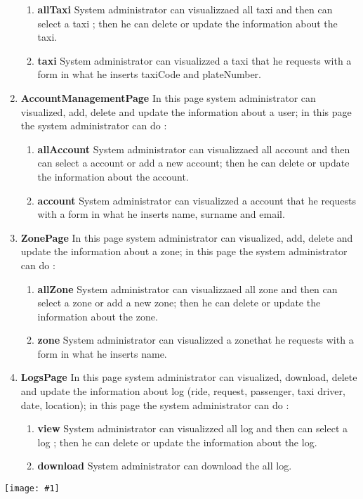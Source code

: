 \documentclass[11pt, a4paper,titlepage]{article}
\newcommand{\image}[1]{
	\begin{center}
		\noindent \texttt{[image: \#1]}
	\end{center}
	}
\begin{document}
\begin{enumerate}
		\begin{enumerate}
			\item \textbf{allTaxi} System administrator can visualizzaed all taxi and then can select a taxi ; 
			then he can delete or update the information about the taxi.
			\item \textbf{taxi} System administrator can visualizzed a taxi that he requests with a form in what he inserts taxiCode and plateNumber.
		\end{enumerate}
		\item \textbf{AccountManagementPage} In this page system administrator can visualized, add, delete and update the information about a user; in this page the system administrator can do :
		\begin{enumerate}
			\item \textbf{allAccount} System administrator can visualizzaed all account and then can select a account or add a new account; then he can delete or update the information about the account.
			\item \textbf{account} System administrator can visualizzed a account that he requests with a form in what he inserts name, surname and email.
		\end{enumerate}
		\item \textbf{ZonePage} In this page system administrator can visualized, add, delete and update the information about a zone; in this page the system administrator can do :
		\begin{enumerate}
			\item \textbf{allZone} System administrator can visualizzaed all zone and then can select a zone or add a new zone; then he can delete or update the information about the zone.
			\item \textbf{zone} System administrator can visualizzed a zonethat he requests with a form in what he inserts name.
		\end{enumerate}
		\item \textbf{LogsPage} In this page system administrator can visualized, download, delete and update the information about log (ride, request, passenger, taxi driver, date, location); in this page the system administrator can do :
		\begin{enumerate}
			\item \textbf{view} System administrator can visualizzed all log and then can select a log ; then he can delete or update the information about the log.
			\item \textbf{download} System administrator can download the all log.
		\end{enumerate}
	\end{enumerate}
	\image{ux_systemadministrator.png}
\end{document}
